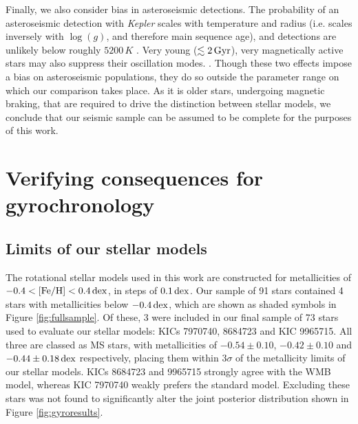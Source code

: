 \documentclass[12pt]{article}
\newcommand{\logg}{\mbox{$\log(g)$}\xspace}
\newcommand{\kepler}{\emph{Kepler}\xspace}
\begin{document}
Finally, we also consider bias in asteroseismic detections. The probability of an asteroseismic detection with \kepler scales with temperature and radius (i.e. scales inversely with \logg, and therefore main sequence age), and detections are unlikely below roughly $5200\, K$ \cite{m_chaplin+2011, m_schofield+2019}. Very young ($\lesssim 2\, \rm{Gyr}$), very magnetically active stars may also suppress their oscillation modes. \cite{m_mathur+2019}. Though these two effects impose a bias on asteroseismic populations, they do so outside the parameter range on which our comparison takes place. As it is older stars, undergoing magnetic braking, that are required to drive the distinction between stellar models, we conclude that our seismic sample can be assumed to be complete for the purposes of this work.

\section{Verifying consequences for gyrochronology}
\subsection{Limits of our stellar models}\label{ssec:limits}
The rotational stellar models used in this work \cite{m_vansaders+2019} are constructed for metallicities of $-0.4 < \rm{[Fe/H]} < 0.4\, \rm{dex}$, in steps of $0.1\, \rm {dex}$. Our sample of 91 stars contained 4 stars with metallicities below $-0.4\, \rm{dex}$, which are shown as shaded symbols in Figure \ref{fig:fullsample}. Of these, 3 were included in our final sample of 73 stars used to evaluate our stellar models: KICs 7970740, 8684723 and KIC 9965715. All three are classed as MS stars, with metallicities of $-0.54 \pm 0.10$, $-0.42 \pm 0.10$ and $-0.44 \pm 0.18\, \rm {dex}$ respectively, placing them within $3\sigma$ of the metallicity limits of our stellar models. KICs 8684723 and 9965715 strongly agree with the WMB model, whereas KIC 7970740 weakly prefers the standard model. Excluding these stars was not found to significantly alter the joint posterior distribution shown in Figure \ref{fig:gyroresults}.
\end{document}
